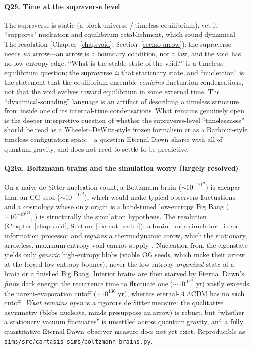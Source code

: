 \paragraph{Q29. Time at the supraverse level}
The supraverse is static (a block universe / timeless equilibrium), yet it
``supports'' nucleation and equilibrium establishment, which sound dynamical. The
resolution (Chapter~\ref{chap:void}, Section~\ref{sec:no-arrow}): the
supraverse needs \emph{no} arrow---an arrow is a boundary condition, not a law, and the
void has no low-entropy edge. ``What is the stable state of the void?'' is a timeless,
equilibrium question; the supraverse \emph{is} that stationary state, and ``nucleation'' is
the statement that the equilibrium ensemble \emph{contains} fluctuation-condensations,
not that the void evolves toward equilibrium in some external time. The
``dynamical-sounding'' language is an artifact of describing a timeless structure from
inside one of its internal-time condensations. What remains genuinely open is the
deeper interpretive question of whether the supraverse-level ``timelessness'' should be
read as a Wheeler--DeWitt-style frozen formalism or as a Barbour-style timeless
configuration space---a question Eternal Dawn\ shares with all of quantum gravity, and does not
need to settle to be predictive.

\paragraph{Q29a. Boltzmann brains and the simulation worry (largely resolved)}
On a naive de Sitter nucleation count, a Boltzmann brain ($\sim 10^{-10^{69}}$) is
cheaper than an OG seed ($\sim 10^{-10^{84}}$), which would make typical observers
fluctuations---and a cosmology whose only origin is a hand-tuned low-entropy Big Bang
($\sim 10^{-10^{123}}$, \citealp{penrose2010}) is structurally the simulation
hypothesis. The resolution (Chapter~\ref{chap:void},
Section~\ref{sec:not-brains}): a brain---or a simulator---is an information processor
and \emph{requires} a thermodynamic arrow, which the stationary, arrowless,
maximum-entropy void cannot supply~\citep{boddy2014}. Nucleation from the eigenstate
yields only \emph{generic} high-entropy blobs (viable OG seeds, which make their arrow
at the forced low-entropy bounce), never the low-entropy \emph{organized} state of a
brain or a finished Big Bang. Interior brains are then starved by Eternal Dawn's \emph{finite}
dark energy: the recurrence time to fluctuate one ($\sim 10^{10^{69}}$ yr) vastly
exceeds the parent-evaporation cutoff ($\sim 10^{136}$ yr), whereas eternal-$\Lambda$
$\Lambda$CDM has no such cutoff. \emph{What remains open} is a rigorous de Sitter
measure: the qualitative asymmetry (blobs nucleate, minds presuppose an arrow) is
robust, but ``whether a stationary vacuum fluctuates'' is unsettled across quantum
gravity, and a fully quantitative Eternal Dawn\ observer measure does not yet exist.
Reproducible as \texttt{sims/src/cartasis\_sims/boltzmann\_brains.py}.


